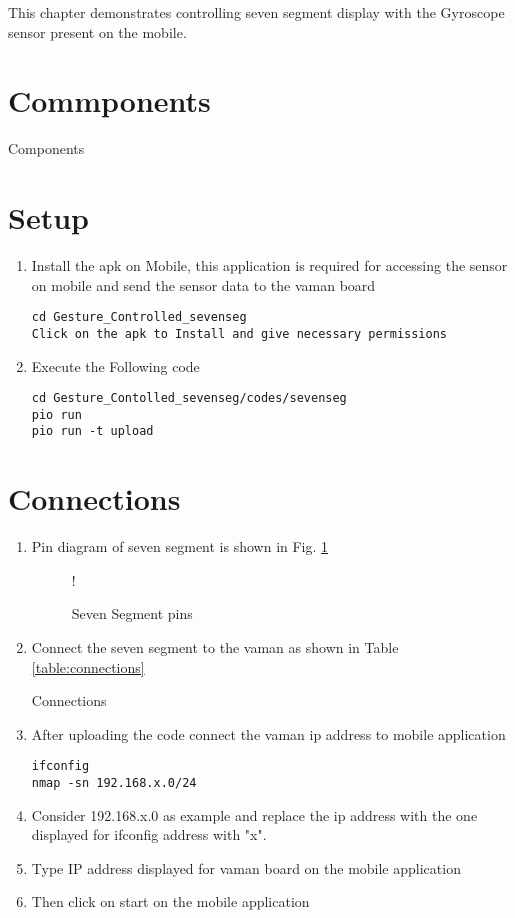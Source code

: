 This chapter demonstrates controlling seven segment display with the Gyroscope sensor present on the mobile. 

\section{Commponents}
\begin{table}[!ht]
	    \centering
	    
	    \caption{Components}
	\end{table}
\section{Setup}
\begin{enumerate}
    \item Install the apk on Mobile, this application is required for accessing the sensor on mobile and send the sensor data to the vaman board
\begin{lstlisting}
cd Gesture_Controlled_sevenseg
Click on the apk to Install and give necessary permissions
\end{lstlisting}
    \item Execute the Following code
\begin{lstlisting}
cd Gesture_Contolled_sevenseg/codes/sevenseg
pio run
pio run -t upload
\end{lstlisting}
\end{enumerate}
\section{Connections}
\begin{enumerate}
    \item Pin diagram of seven segment is shown in Fig. \ref{fig:sevenseg}
    	\begin{figure}[!ht]
		\begin{center}
		\resizebox {0.5\columnwidth} {!} {
		}
		\end{center}
		\caption{Seven Segment pins}
		\label{fig:sevenseg}
	\end{figure}
    \item Connect the seven segment to the vaman as shown in Table \ref{table:connections}
    	\begin{table}[!ht]
	    \centering
	    
	    \caption{Connections}
	    \label{table:connections}
	\end{table}
    \item After uploading the code connect the vaman ip address to mobile application
\begin{lstlisting}
ifconfig
nmap -sn 192.168.x.0/24
\end{lstlisting}
    \item Consider 192.168.x.0 as example and replace the ip address with the one displayed for ifconfig address with "x".
    \item Type IP address displayed for vaman board on the mobile application
    \item Then click on start on the mobile application
\end{enumerate}

